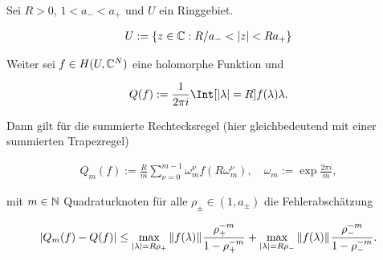 \begin{lemma} \label{lem:quadratur_konvergenz}

    Sei $R > 0$, $1 < a_- < a_+$ und $U$ ein Ringgebiet.

    \begin{align*}
        U := {\left \{ z \in \mathbb{C}: R / a_- < {\left | z \right |} < R a_+ \right \}}
    \end{align*}

    Weiter sei $f \in H(U, \mathbb{C}^N)$ eine holomorphe Funktion und

    \begin{align*}
        Q(f)
        :=
        \frac{1}{2 \pi i}
        \Int[\abs{\lambda} = R]{f(\lambda)}{\lambda}.
    \end{align*}

    Dann gilt für die summierte Rechtecksregel (hier gleichbedeutend mit einer summierten Trapezregel)

    \begin{align*}
        Q_m(f)
        :=
        \frac{R}{m}
        \sum_{\nu = 0}^{m - 1}
            \omega_m^\nu
            f(R \omega_m^\nu),
        \quad
        \omega_m
        :=
        \exp \frac{2 \pi i}{m},
    \end{align*}

    mit $m \in \mathbb{N}$ Quadraturknoten für alle $\rho_\pm \in (1, a_\pm)$ die Fehlerabschätzung

    \begin{align*}
        {\left | Q_m(f) - Q(f) \right |}
        \leq
        \max_{{\left | \lambda \right |} = R \rho_+}
            {\left \| f(\lambda) \right \|}_{}
        \frac{\rho_+^{-m}}{1 - \rho_+^{-m}}
        +
        \max_{{\left | \lambda \right |} = R \rho_-}
            {\left \| f(\lambda) \right \|}_{}
        \frac{\rho_-^{-m}}{1 - \rho_-^{-m}}.
    \end{align*}

\end{lemma}
